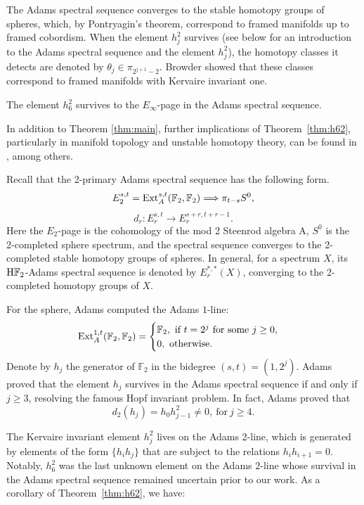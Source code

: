 \documentclass{amsart}
\numberwithin{equation}{section}
\newcommand{\HF}{\mathrm{H}\bF_2}
\begin{document}
The Adams spectral sequence \cite{Adams58} converges to the stable homotopy groups of spheres, which, by Pontryagin's theorem, correspond to framed manifolds up to framed cobordism. When the element $h_j^2$ survives (see below for an introduction to the Adams spectral sequence and the element $h_j^2$), the homotopy classes it detects are denoted by $\theta_j \in \pi_{2^{j+1}-2}$. Browder showed that these classes correspond to framed manifolds with Kervaire invariant one. 

\begin{theorem} \label{thm:h62}
    The element $h_6^2$ survives to the $E_\infty$-page in the Adams spectral sequence.
\end{theorem}

In addition to Theorem \ref{thm:main}, further implications of Theorem~\ref{thm:h62}, particularly in manifold topology and unstable homotopy theory, can be found in \cite{MillerHHR, MahowaldRemark, HHR, BJMinduction}, among others. 


Recall that the 2-primary Adams spectral sequence has the following form.
$$E_2^{s,t} = \mathrm{Ext}^{s, t}_A(\mathbb{F}_2, \mathbb{F}_2) \Longrightarrow \pi_{t-s} {S^0},$$
$$d_r: E_r^{s,t} \longrightarrow E_r^{s+r, t+r-1}.$$
Here the $E_2$-page is the cohomology of the mod 2 Steenrod algebra A, $S^0$ is the 2-completed sphere spectrum, and the spectral sequence converges to the 2-completed stable homotopy groups of spheres. In general, for a spectrum $X$, its $\HF$-Adams spectral sequence is denoted by $E_r^{*,*}(X)$, converging to the 2-completed homotopy groups of $X$.

For the sphere, Adams \cite{Adams58} computed the Adams $1$-line: 
$$\mathrm{Ext}^{1,t}_A(\mathbb{F}_2, \mathbb{F}_2) = \begin{cases}
 	\mathbb{F}_2, \ \text{if} \ t = 2^j \ \text{for some} \ j \geq 0, \\
 	0, \ \text{otherwise}.
\end{cases}
$$
Denote by $h_j$ the generator of $\mathbb{F}_2$ in the bidegree $(s, t)=(1, 2^j)$. Adams \cite{Adams60} proved that the element $h_j$ survives in the Adams spectral sequence if and only if $j \geq 3$, resolving the famous Hopf invariant problem. In fact, Adams proved that
$$d_2(h_j) = h_0h_{j-1}^2 \neq 0, \ \text{for} \ j \geq 4.$$

The Kervaire invariant element $h_j^2$ lives on the Adams 2-line, which is generated by elements of the form $\{h_ih_j\}$ that are subject to the relations $h_ih_{i+1} = 0$. Notably, $h_6^2$ was the last unknown element on the Adams 2-line whose survival in the Adams spectral sequence remained uncertain prior to our work. As a corollary of Theorem~\ref{thm:h62}, we have:
\end{document}
